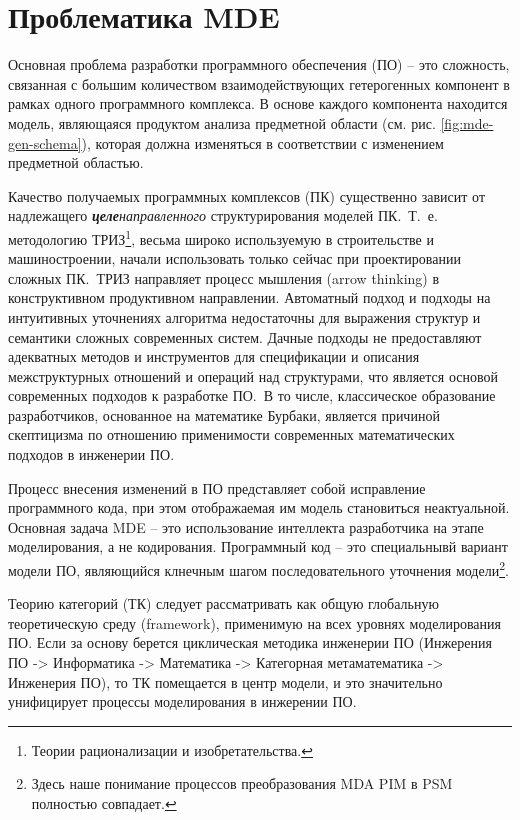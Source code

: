 \documentclass[12pt,a4paper]{extarticle}
\begin{document}
\section{Проблематика MDE}
\label{sec:problem-mde}

Основная проблема разработки программного обеспечения (ПО) -- это сложность,
связанная с большим количеством взаимодействующих гетерогенных компонент в
рамках одного программного комплекса.  В основе каждого компонента находится
модель, являющаяся продуктом анализа предметной области (см. рис.
\ref{fig:mde-gen-schema}), которая должна изменяться в соответствии с изменением
предметной областью.

Качество получаемых программных комплексов (ПК) существенно зависит от
надлежащего \emph{\textbf{целе}направленного} структурирования моделей ПК.~Т.~е.
методологию ТРИЗ\footnote{Теории рационализации и изобретательства.}, весьма
широко используемую в строительстве и машиностроении, начали использовать только
сейчас при проектировании сложных ПК.~ТРИЗ направляет процесс мышления (arrow
thinking) в конструктивном продуктивном направлении. Автоматный подход и подходы
на интуитивных уточнениях алгоритма недостаточны для выражения структур и
семантики сложных современных систем. Дачные подходы не предоставляют адекватных
методов и инструментов для спецификации и описания межструктурных отношений и
операций над структурами, что является основой современных подходов к разработке
ПО.~В то числе, классическое образование разработчиков, основанное на математике
Бурбаки, является причиной скептицизма по отношению применимости современных
математических подходов в инженерии ПО.

Процесс внесения изменений в ПО представляет собой исправление программного
кода, при этом отображаемая им модель становиться неактуальной.  Основная задача
MDE -- это использование интеллекта разработчика на этапе моделирования, а не
кодирования. Программный код -- это специальнывй вариант модели ПО, являющийся
клнечным шагом последовательного уточнения модели\footnote{Здесь наше понимание
 процессов преобразования MDA PIM в PSM полностью совпадает.}.

Теорию категорий (ТК) следует рассматривать как общую глобальную
теоретическую среду (framework), применимую на всех уровнях моделирования ПО.
Если за основу берется циклическая методика инженерии ПО (Инжерения ПО ->
Информатика -> Математика -> Категорная метаматематика -> Инженерия ПО), то ТК
помещается в центр модели, и это значительно унифицирует процессы моделирования
в инжерении ПО.
\end{document}
